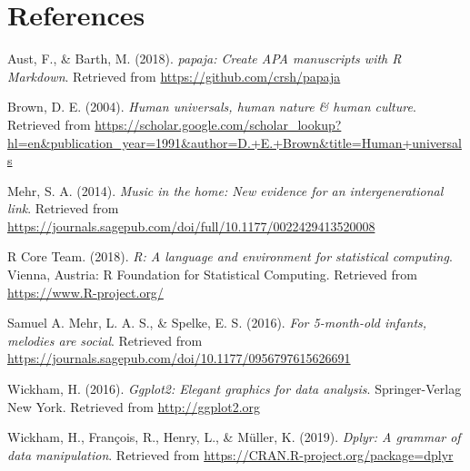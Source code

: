 \documentclass[man]{apa6}
\begin{document}
\section{References}\label{references}

\begingroup
\setlength{\parindent}{-0.5in} \setlength{\leftskip}{0.5in}

\hypertarget{refs}{}
\hypertarget{ref-R-papaja}{}
Aust, F., \& Barth, M. (2018). \emph{papaja: Create APA manuscripts with
R Markdown}. Retrieved from \url{https://github.com/crsh/papaja}

\hypertarget{ref-R-data.table}{}
Brown, D. E. (2004). \emph{Human universals, human nature \& human
culture}. Retrieved from
\url{https://scholar.google.com/scholar_lookup?hl=en\&publication_year=1991\&author=D.+E.+Brown\&title=Human+universals}

\hypertarget{ref-R-pwr}{}
Mehr, S. A. (2014). \emph{Music in the home: New evidence for an
intergenerational link}. Retrieved from
\url{https://journals.sagepub.com/doi/full/10.1177/0022429413520008}

\hypertarget{ref-R-base}{}
R Core Team. (2018). \emph{R: A language and environment for statistical
computing}. Vienna, Austria: R Foundation for Statistical Computing.
Retrieved from \url{https://www.R-project.org/}

\hypertarget{ref-R-summarytools}{}
Samuel A. Mehr, L. A. S., \& Spelke, E. S. (2016). \emph{For 5-month-old
infants, melodies are social}. Retrieved from
\url{https://journals.sagepub.com/doi/10.1177/0956797615626691}

\hypertarget{ref-R-ggplot2}{}
Wickham, H. (2016). \emph{Ggplot2: Elegant graphics for data analysis}.
Springer-Verlag New York. Retrieved from \url{http://ggplot2.org}

\hypertarget{ref-R-dplyr}{}
Wickham, H., François, R., Henry, L., \& Müller, K. (2019). \emph{Dplyr:
A grammar of data manipulation}. Retrieved from
\url{https://CRAN.R-project.org/package=dplyr}

\endgroup
\end{document}
